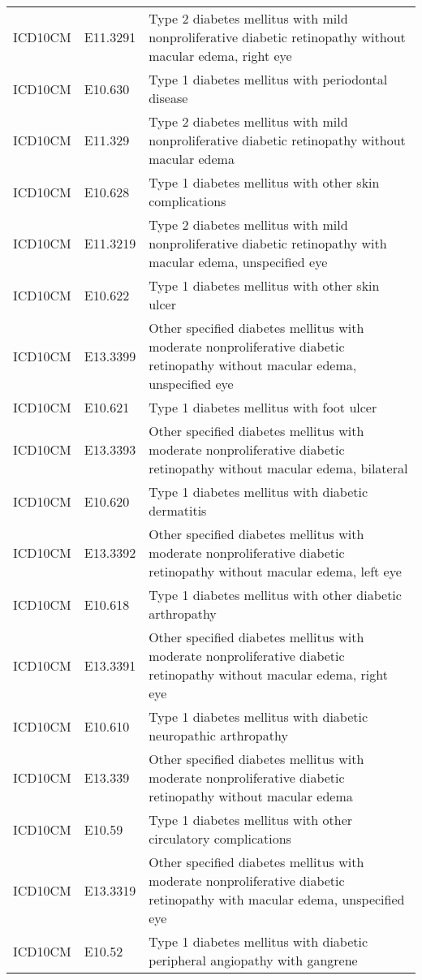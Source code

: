 \begin{table}[ht]
\begin{tabular}{lll}
  ICD10CM & E11.3291 & Type 2 diabetes mellitus with mild nonproliferative diabetic retinopathy without macular edema, right eye \\ 
  ICD10CM & E10.630 & Type 1 diabetes mellitus with periodontal disease \\ 
  ICD10CM & E11.329 & Type 2 diabetes mellitus with mild nonproliferative diabetic retinopathy without macular edema \\ 
  ICD10CM & E10.628 & Type 1 diabetes mellitus with other skin complications \\ 
  ICD10CM & E11.3219 & Type 2 diabetes mellitus with mild nonproliferative diabetic retinopathy with macular edema, unspecified eye \\ 
  ICD10CM & E10.622 & Type 1 diabetes mellitus with other skin ulcer \\ 
  ICD10CM & E13.3399 & Other specified diabetes mellitus with moderate nonproliferative diabetic retinopathy without macular edema, unspecified eye \\ 
  ICD10CM & E10.621 & Type 1 diabetes mellitus with foot ulcer \\ 
  ICD10CM & E13.3393 & Other specified diabetes mellitus with moderate nonproliferative diabetic retinopathy without macular edema, bilateral \\ 
  ICD10CM & E10.620 & Type 1 diabetes mellitus with diabetic dermatitis \\ 
  ICD10CM & E13.3392 & Other specified diabetes mellitus with moderate nonproliferative diabetic retinopathy without macular edema, left eye \\ 
  ICD10CM & E10.618 & Type 1 diabetes mellitus with other diabetic arthropathy \\ 
  ICD10CM & E13.3391 & Other specified diabetes mellitus with moderate nonproliferative diabetic retinopathy without macular edema, right eye \\ 
  ICD10CM & E10.610 & Type 1 diabetes mellitus with diabetic neuropathic arthropathy \\ 
  ICD10CM & E13.339 & Other specified diabetes mellitus with moderate nonproliferative diabetic retinopathy without macular edema \\ 
  ICD10CM & E10.59 & Type 1 diabetes mellitus with other circulatory complications \\ 
  ICD10CM & E13.3319 & Other specified diabetes mellitus with moderate nonproliferative diabetic retinopathy with macular edema, unspecified eye \\ 
  ICD10CM & E10.52 & Type 1 diabetes mellitus with diabetic peripheral angiopathy with gangrene \\ 

\end{tabular}
\end{table}
